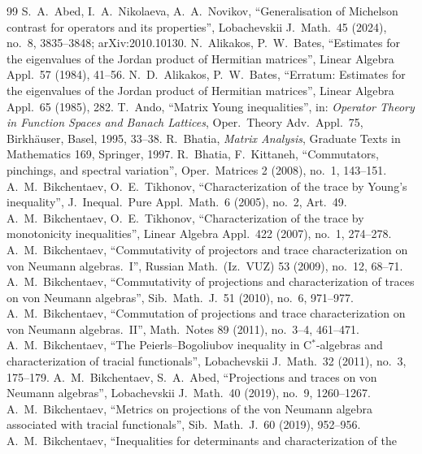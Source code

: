 \documentclass[11pt]{article}
\theoremstyle{plain}
\theoremstyle{definition}
\theoremstyle{remark}
\begin{document}
\clearpage
{\sloppy
\begin{thebibliography}{99}
 S.~A.~Abed, I.~A.~Nikolaeva, A.~A.~Novikov, ``Generalisation of Michelson contrast for
  operators and its properties'', Lobachevskii J.\ Math.\ 45 (2024), no.~8, 3835--3848; arXiv:2010.10130.
 N.~Alikakos, P.~W.~Bates, ``Estimates for the eigenvalues of the Jordan product of Hermitian
  matrices'', Linear Algebra Appl.\ 57 (1984), 41--56.
 N.~D.~Alikakos, P.~W.~Bates, ``Erratum: Estimates for the eigenvalues of the Jordan product of
  Hermitian matrices'', Linear Algebra Appl.\ 65 (1985), 282.
 T.~Ando, ``Matrix Young inequalities'', in: \emph{Operator Theory in Function Spaces and Banach
  Lattices}, Oper.\ Theory Adv.\ Appl.\ 75, Birkh\"auser, Basel, 1995, 33--38.
 R.~Bhatia, \emph{Matrix Analysis}, Graduate Texts in Mathematics 169, Springer, 1997.
 R.~Bhatia, F.~Kittaneh, ``Commutators, pinchings, and spectral variation'', Oper.\ Matrices 2
  (2008), no.~1, 143--151.
 A.~M.~Bikchentaev, O.~E.~Tikhonov, ``Characterization of the trace by Young's
  inequality'', J.\ Inequal.\ Pure Appl.\ Math.\ 6 (2005), no.~2, Art.~49.
 A.~M.~Bikchentaev, O.~E.~Tikhonov, ``Characterization of the trace by monotonicity
  inequalities'', Linear Algebra Appl.\ 422 (2007), no.~1, 274--278.
 A.~M.~Bikchentaev, ``Commutativity of projectors and trace characterization on von Neumann
  algebras.~I'', Russian Math.\ (Iz.\ VUZ) 53 (2009), no.~12, 68--71.
 A.~M.~Bikchentaev, ``Commutativity of projections and characterization of traces on von
  Neumann algebras'', Sib.\ Math.\ J.\ 51 (2010), no.~6, 971--977.
 A.~M.~Bikchentaev, ``Commutation of projections and trace characterization on von
  Neumann algebras.~II'', Math.\ Notes 89 (2011), no.~3--4, 461--471.
 A.~M.~Bikchentaev, ``The Peierls--Bogoliubov inequality in C$^*$-algebras and
  characterization of tracial functionals'', Lobachevskii J.\ Math.\ 32 (2011), no.~3, 175--179.
 A.~M.~Bikchentaev, S.~A.~Abed, ``Projections and traces on von Neumann algebras'',
  Lobachevskii J.\ Math.\ 40 (2019), no.~9, 1260--1267.
 A.~M.~Bikchentaev, ``Metrics on projections of the von Neumann algebra associated
  with tracial functionals'', Sib.\ Math.\ J.\ 60 (2019), 952--956.
 A.~M.~Bikchentaev, ``Inequalities for determinants and characterization of the

\end{thebibliography}}
\end{document}

